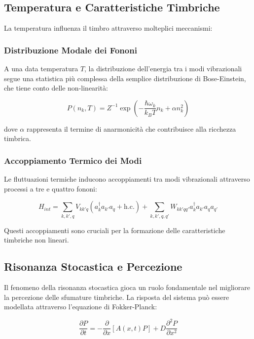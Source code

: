 \documentclass[a4paper,11pt]{article}
\begin{document}
\subsection{Temperatura e Caratteristiche Timbriche}

La temperatura influenza il timbro attraverso molteplici meccanismi:

\subsubsection{Distribuzione Modale dei Fononi}

A una data temperatura $T$, la distribuzione dell'energia tra i modi
vibrazionali segue una statistica più complessa della semplice
distribuzione di Bose-Einstein, che tiene conto delle non-linearità:

\begin{equation}
P(n_k, T) = Z^{-1}\exp\left(-\frac{\hbar\omega_k}{k_BT}n_k + \alpha n_k^2\right)
\end{equation}


dove $\alpha$ rappresenta il termine di anarmonicità che contribuisce
alla ricchezza timbrica.

\subsubsection{Accoppiamento Termico dei Modi}

Le fluttuazioni termiche inducono accoppiamenti tra modi vibrazionali
attraverso processi a tre e quattro fononi:

$$H_{int} = \sum_{k,k',q} V_{kk'q}(a_k^\dagger a_{k'} a_q + \text{h.c.}) +
    \sum_{k,k',q,q'} W_{kk'qq'}a_k^\dagger a_{k'} a_q a_{q'}$$

Questi accoppiamenti sono cruciali per la formazione delle
caratteristiche timbriche non lineari.

\subsection{Risonanza Stocastica e Percezione}

Il fenomeno della risonanza stocastica gioca un ruolo fondamentale nel
migliorare la percezione delle sfumature timbriche. La risposta del
sistema può essere modellata attraverso l'equazione di Fokker-Planck:

\begin{equation}
\frac{\partial P}{\partial t} = -\frac{\partial}{\partial x}[A(x,t)P] + D\frac{\partial^2 P}{\partial x^2}
\end{equation}
\end{document}
